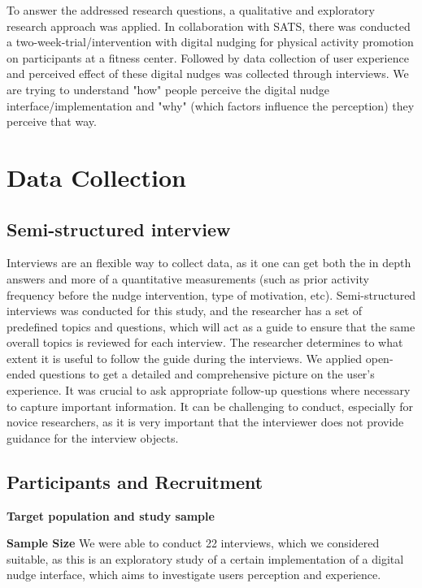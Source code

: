 To answer the addressed research questions, a qualitative and exploratory research approach was applied. In collaboration with SATS, there was conducted a two-week-trial/intervention with digital nudging for physical activity promotion on participants at a fitness center. Followed by data collection of user experience and perceived effect of these digital nudges was collected through interviews. 
We are trying to understand "how" people perceive the digital nudge interface/implementation and "why" (which factors influence the perception) they perceive that way.  


\section{Data Collection}
    \subsection{Semi-structured interview}
    Interviews are an flexible way to collect data, as it one can get both the in depth answers and more of a quantitative measurements (such as prior activity frequency before the nudge intervention, type of motivation, etc). Semi-structured interviews was conducted for this study, and the researcher has a set of predefined topics and questions, which will act as a guide to ensure that the same overall topics is reviewed for each interview. The researcher determines to what extent it is useful to follow the guide during the interviews.
     We applied open-ended questions to get a detailed and comprehensive picture on the user's experience. It was crucial to ask appropriate follow-up questions where necessary to capture important information. It can be challenging to conduct, especially for novice researchers, as it is very important that the interviewer does not provide guidance for the interview objects. 
     
    \subsection{Participants and Recruitment}
\textbf{Target population and study sample}

\textbf{Sample Size} 
 We were able to conduct 22 interviews, which we considered suitable, as this is an exploratory study of a certain implementation of a digital nudge interface, which aims to investigate users perception and experience. 

